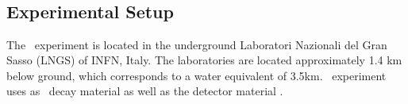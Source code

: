 \documentclass[encoding=utf8,british]{tumphthesis}
\begin{document}


 


\section{\gerda\ \PII}
\label{sec:gerda}


\subsection{Experimental Setup}
\label{sec:ExSetup}
The \gerda\ experiment is located in the underground Laboratori Nazionali del Gran Sasso (LNGS) of INFN, Italy.
The laboratories are located approximately 1.4 km below ground, which corresponds to a water equivalent of 3.5km.
\gerda\ experiment uses  as \onbb\ decay material as well as the detector material \cite{agostini_background_2017}.
\\
\end{document}
